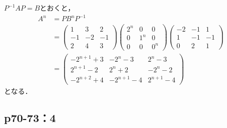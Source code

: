 \documentclass[uplatex,dvipdfmx,a4paper,10pt,fleqn]{jsarticle}
\begin{document}
    \begin{tleftbar}
        $P^{-1} A P = B$とおくと，
        \begin{align*}
            A^n &= P B^n P^{-1} \\
            & = \begin{pmatrix} 1 & 3 & 2 \\ -1 & -2 & -1 \\ 2 & 4 & 3 \end{pmatrix} \begin{pmatrix} 2^n & 0 & 0 \\ 0 & 1^n & 0 \\ 0 & 0 & 0^n \end{pmatrix} \begin{pmatrix} -2 & -1 & 1\\ 1 & -1 & -1 \\ 0 & 2 & 1 \end{pmatrix} \\
            & = \begin{pmatrix} -2^{n+1}+3 & -2^n -3 & 2^n -3 \\ 2^{n+1}-2 & 2^n +2 & -2^n -2 \\ -2^{n+2}+4 & -2^{n+1} -4 & 2^{n+1} -4 \end{pmatrix}
        \end{align*}
        となる．
    \end{tleftbar}
    \newpage 


\subsection*{p70-73：4}
\end{document}
